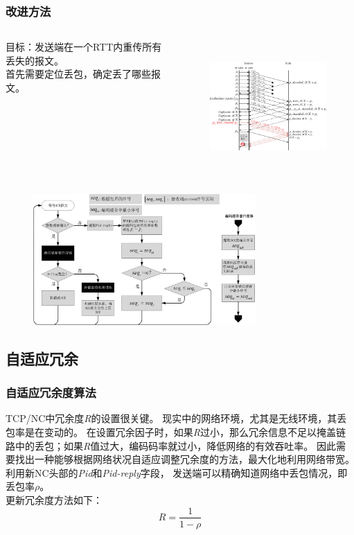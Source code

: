 \begin{frame}
	\frametitle{改进方法}
	\begin{columns}
	\begin{column}{0.5\textwidth}
		目标：发送端在一个RTT内重传所有丢失的报文。
		\\
		首先需要定位丢包，确定丢了哪些报文。
	\end{column}
	\hspace{2em}
	\begin{column}{0.5\textwidth}
		\begin{figure}
			\includegraphics[height=5cm]{../figures/newfr.eps}
			\label{改进重传机制}
		\end{figure}
	\end{column}
	\end{columns}
\end{frame}
\begin{frame}
	\begin{figure}
		\includegraphics[height=5cm]{../figures/fr-rcvack.eps}
	\end{figure}
\end{frame}



\subsection{自适应冗余}
\begin{frame}
	\frametitle{自适应冗余度算法}
	TCP/NC中冗余度\emph{R}的设置很关键。
	现实中的网络环境，尤其是无线环境，其丢包率是在变动的。
	在设置冗余因子时，如果\emph{R}过小，那么冗余信息不足以掩盖链路中的丢包；如果\emph{R}值过大，编码码率就过小，降低网络的有效吞吐率。
	因此需要找出一种能够根据网络状况自适应调整冗余度的方法，最大化地利用网络带宽。
	\\
	\vspace{1em}
	利用新NC头部的\emph{Pid}和\emph{Pid-reply}字段，
	发送端可以精确知道网络中丢包情况，即丢包率$\rho$。
	\\
	更新冗余度方法如下：
	\begin{equation}
	R=\dfrac{1}{1-\rho}
	\end{equation}
\end{frame}


